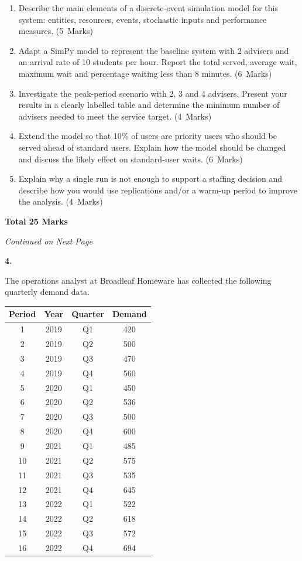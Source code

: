 \documentclass[11pt,a4paper]{article}
\newcommand{\continuednotice}{%
    \vfill
    \begin{center}
    \textit{Continued on Next Page}
    \end{center}
    \newpage
}
\newcommand{\markalloc}[1]{\nobreak\hfill\mbox{(#1 Marks)}}
\newcommand{\questiontotal}[1]{\begin{flushright}\textbf{Total #1 Marks}\end{flushright}}
\begin{document}
\begin{enumerate}
\item Describe the main elements of a discrete-event simulation model for this system: entities, resources, events, stochastic inputs and performance measures. \markalloc{5}

\item Adapt a SimPy model to represent the baseline system with 2 advisers and an arrival rate of 10 students per hour. Report the total served, average wait, maximum wait and percentage waiting less than 8 minutes. \markalloc{6}

\item Investigate the peak-period scenario with 2, 3 and 4 advisers. Present your results in a clearly labelled table and determine the minimum number of advisers needed to meet the service target. \markalloc{4}

\item Extend the model so that 10\% of users are priority users who should be served ahead of standard users. Explain how the model should be changed and discuss the likely effect on standard-user waits. \markalloc{6}

\item Explain why a single run is not enough to support a staffing decision and describe how you would use replications and/or a warm-up period to improve the analysis. \markalloc{4}
\end{enumerate}

\questiontotal{25}

\continuednotice

\textbf{4.}

The operations analyst at Broadleaf Homeware has collected the following quarterly demand data.

\begin{center}
\begin{tabular}{cccc}
\toprule
Period & Year & Quarter & Demand \\
\midrule
1  & 2019 & Q1 & 420 \\
2  & 2019 & Q2 & 500 \\
3  & 2019 & Q3 & 470 \\
4  & 2019 & Q4 & 560 \\
5  & 2020 & Q1 & 450 \\
6  & 2020 & Q2 & 536 \\
7  & 2020 & Q3 & 500 \\
8  & 2020 & Q4 & 600 \\
9  & 2021 & Q1 & 485 \\
10 & 2021 & Q2 & 575 \\
11 & 2021 & Q3 & 535 \\
12 & 2021 & Q4 & 645 \\
13 & 2022 & Q1 & 522 \\
14 & 2022 & Q2 & 618 \\
15 & 2022 & Q3 & 572 \\
16 & 2022 & Q4 & 694 \\
\bottomrule
\end{tabular}
\end{center}
\end{document}
